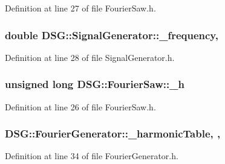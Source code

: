 Definition at line 27 of file Fourier\+Saw.\+h.

\hypertarget{classDSG_1_1SignalGenerator_a67e296e3506dcdf09402c667cddff9ac}{
\subsubsection[{\+\_\+frequency}]{\setlength{\rightskip}{0pt plus 5cm}double D\+S\+G\+::\+Signal\+Generator\+::\+\_\+frequency\hspace{0.3cm}{\ttfamily [protected]}, {\ttfamily [inherited]}}}\label{classDSG_1_1SignalGenerator_a67e296e3506dcdf09402c667cddff9ac}


Definition at line 28 of file Signal\+Generator.\+h.

\hypertarget{classDSG_1_1FourierSaw_afaa437e6dda9ddbd4f011012dfe3c55a}{
\subsubsection[{\+\_\+h}]{\setlength{\rightskip}{0pt plus 5cm}unsigned long D\+S\+G\+::\+Fourier\+Saw\+::\+\_\+h\hspace{0.3cm}{\ttfamily [protected]}}}\label{classDSG_1_1FourierSaw_afaa437e6dda9ddbd4f011012dfe3c55a}


Definition at line 26 of file Fourier\+Saw.\+h.

\hypertarget{classDSG_1_1FourierGenerator_a7288408f8e44d5edb5eecc62480243d7}{
\subsubsection[{\+\_\+harmonic\+Table}]{ D\+S\+G\+::\+Fourier\+Generator\+::\+\_\+harmonic\+Table\hspace{0.3cm}{\ttfamily [static]}, {\ttfamily [protected]}, {\ttfamily [inherited]}}}\label{classDSG_1_1FourierGenerator_a7288408f8e44d5edb5eecc62480243d7}


Definition at line 34 of file Fourier\+Generator.\+h.

